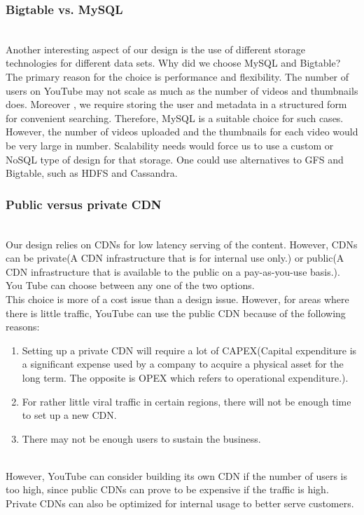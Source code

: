 \subsubsection{Bigtable vs. MySQL}\label{sL68IcD9Vb8309Ou5gFFq}
\\
Another interesting aspect of our design is the use of different storage technologies for different data sets. Why did we choose MySQL and Bigtable?
\\
The primary reason for the choice is performance and flexibility. The number of users on YouTube may not scale as much as the number of videos and thumbnails does. Moreover , we require storing the user and metadata in a structured form for convenient searching. Therefore, MySQL is a suitable choice for such cases.
\\
However, the number of videos uploaded and the thumbnails for each video would be very large in number. Scalability needs would force us to use a custom or NoSQL type of design for that storage. One could use alternatives to GFS and Bigtable, such as HDFS and Cassandra.

\subsubsection{Public versus private CDN}\label{FPhYiEeidNzRRs7EO9YcM}
\\
Our design relies on CDNs for low latency serving of the content. However, CDNs can be private(A CDN infrastructure that is for internal use only.) or public(A CDN infrastructure that is available to the public on a pay-as-you-use basis.). You Tube can choose between any one of the two options.
\\
This choice is more of a cost issue than a design issue. However, for areas where there is little traffic, YouTube can use the public CDN because of the following reasons:

\begin{enumerate}
\item
\protect{}\label{6sW3ovcC-UNHuFzZYNaXF}
Setting up a private CDN will require a lot of CAPEX(Capital expenditure is a significant expense used by a company to acquire a physical asset for the long term. The opposite is OPEX which refers to operational expenditure.).
\item
\protect{}\label{YT8wAR3t9eqWo8Bt9ZRgp}
For rather little viral traffic in certain regions, there will not be enough time to set up a new CDN.
\item
\protect{}\label{Yhg25Pk9q7vnTUdDKufPL}
There may not be enough users to sustain the business.
\end{enumerate}
\\
However, YouTube can consider building its own CDN if the number of users is too high, since public CDNs can prove to be expensive if the traffic is high. Private CDNs can also be optimized for internal usage to better serve customers.

